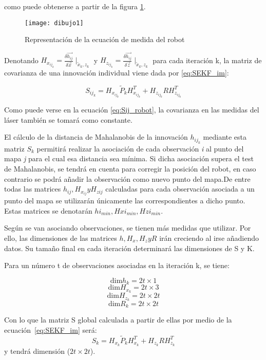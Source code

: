 \noindent
como puede obtenerse a partir de la figura \ref{fg:medidas}.

\begin{figure}[h]
  \centering\texttt{[image: dibujo1]}\\
  \caption{Representación de la ecuación de medida del robot}\label{fg:medidas}
\end{figure}


Denotando $H_{x_{ij_{k}}} = \frac{\delta \vec{h_{ij}}}{\delta \vec{x}}\mid _{\tilde{x}_k,z_{k}}$ y $H_{z_{ij_{k}}} = \frac{\delta \vec{h_{ij}}}{\delta \vec{z}}\mid _{\tilde{x}_k,z_{k}}$ para cada iteración k, la matriz de covarianza de una innovación individual viene dada por \ref{eq:SEKF_im}:

\begin{equation}\label{eq:Sij_robot}
    S_{ij_{k}} = H_{x_{ij_{k}}}\tilde{P}_{k}H_{x_{ij_{k}}}^{T}+H_{z_{ij_{k}}}RH_{z_{ij_{k}}}^{T}
\end{equation}

Como puede verse en la ecuación \ref{eq:Sij_robot}, la covarianza en las medidas del láser también se tomará como constante.

El cálculo de la distancia de Mahalanobis de la innovación $h_{ij_{k}}$ mediante esta matriz $S_{k}$ permitirá realizar la asociación de cada observación \emph{i} al punto del mapa \emph{j} para el cual esa distancia sea mínima. Si dicha asociación supera el test de Mahalanobis, se tendrá en cuenta para corregir la posición del robot, en caso contrario se podrá añadir la observación como nuevo punto del mapa.De entre todas las matrices $h_{ij}, H_{x_{ij}} y H_{z{ij}}$ calculadas para cada observación asociada a un punto del mapa se utilizarán únicamente las correspondientes a dicho punto. Estas matrices se denotarán $hi_{min}, Hxi_{min}, Hzi_{min}$.

Según se van asociando observaciones, se tienen más medidas que utilizar. Por ello, las dimensiones de las matrices $h, H_{x}, H_{z} y R$ irán creciendo al irse añadiendo datos. Su tamaño final en cada iteración determinará las dimensiones de S y K.

Para un número t de observaciones asociadas en la iteración k, se tiene:

\[ \mbox{dim}  h_{k}            =   2t \times 1 \]
\[ \mbox{dim}  H_{x_{k}}     =  2t \times 3 \]
\[ \mbox{dim}  H_{z_{k}}     =  2t \times 2t \]
\[ \mbox{dim}  R_{k}            =  2t \times 2t \]

Con lo que la matriz S global calculada a partir de ellas por medio de la ecuación~\ref{eq:SEKF_im} será:
\begin{equation}\label{eq:S_robot}
    S_{k} = H_{x_{k}}\tilde{P}_{k}H_{x_{k}}^{T}+H_{z_{k}}RH_{z_{k}}^{T}
\end{equation}
y tendrá dimensión ($2t \times 2t$).


